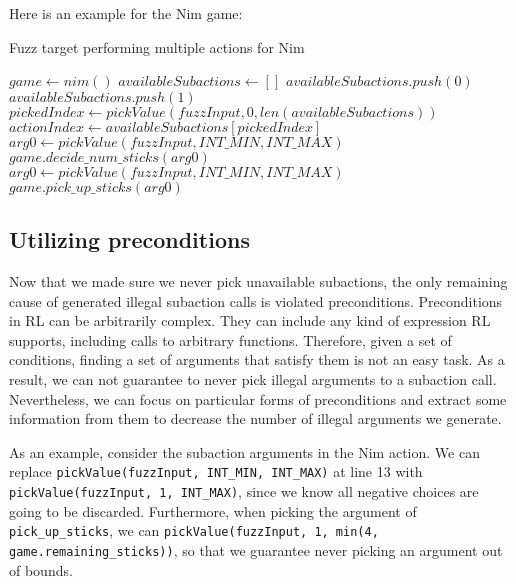 Here is an example for the Nim game:
\begin{algorithm}[H]
    \caption{Fuzz target performing multiple actions for Nim}
    \begin{algorithmic}[1]
    \STATE $game \gets nim()$
        \STATE $availableSubactions \gets []$
            \STATE $availableSubactions.push(0)$
        \ENDIF
            \STATE $availableSubactions.push(1)$
        \ENDIF
        \STATE $pickedIndex \gets pickValue(fuzzInput, 0, len(availableSubactions))$
        \STATE $actionIndex \gets availableSubactions[pickedIndex]$
            \STATE $arg0 \gets pickValue(fuzzInput, INT\_MIN, INT\_MAX)$
                \STATE $game.decide\_num\_sticks(arg0)$
            \ENDIF
        \ENDIF
            \STATE $arg0 \gets pickValue(fuzzInput, INT\_MIN, INT\_MAX)$
                \STATE $game.pick\_up\_sticks(arg0)$
            \ENDIF
        \ENDIF
    \ENDWHILE
    \end{algorithmic}
\end{algorithm}

\subsection{Utilizing preconditions}
Now that we made sure we never pick unavailable subactions, the only remaining cause of generated illegal subaction calls is violated preconditions.
Preconditions in RL can be arbitrarily complex. They can include any kind of expression RL supports, including calls to arbitrary functions.
Therefore, given a set of conditions, finding a set of arguments that satisfy them is not an easy task.
As a result, we can not guarantee to never pick illegal arguments to a subaction call.
Nevertheless, we can focus on particular forms of preconditions and extract some information from them to decrease the number of illegal arguments we generate.

As an example, consider the subaction arguments in the Nim action.
We can replace \texttt{pickValue(fuzzInput, INT\_MIN, INT\_MAX)} at line 13 with \texttt{pickValue(fuzzInput, 1, INT\_MAX)}, since we know all negative choices are going to be discarded.
Furthermore, when picking the argument of \texttt{pick\_up\_sticks}, we can \texttt{pickValue(fuzzInput, 1, min(4, game.remaining\_sticks))}, so that we guarantee never picking an argument out of bounds.

